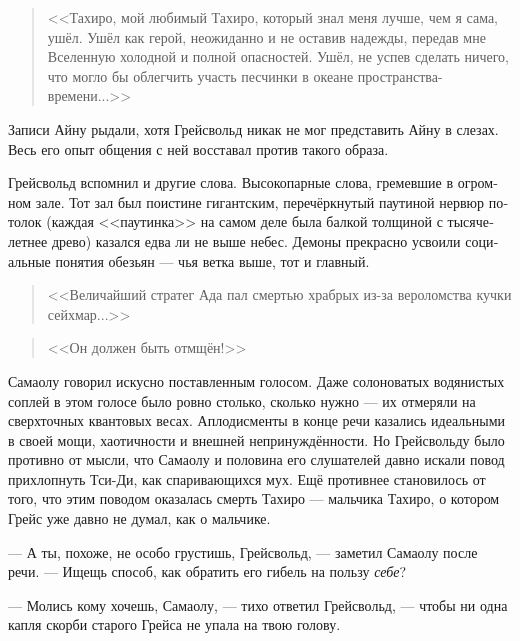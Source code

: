 \documentclass[a4paper,12pt,fleqn]{book}\usepackage{polyglossia}\setdefaultlanguage[babelshorthands=true]{russian}\setotherlanguage{english}\defaultfontfeatures{Ligatures=TeX,Mapping=tex-text}\usepackage{xcolor}\newcommand{\ml}[3]{#2}
\begin{document}
\begin{quote}
<<Тахиро, мой любимый Тахиро, который знал меня лучше, чем я сама, ушёл.
Ушёл как герой, неожиданно и не оставив надежды, передав мне Вселенную холодной и полной опасностей.
Ушёл, не успев сделать ничего, что могло бы облегчить участь песчинки в океане пространства-времени...>>
\end{quote}

Записи Айну рыдали, хотя Грейсвольд никак не мог представить Айну в слезах.
Весь его опыт общения с ней восставал против такого образа.

Грейсвольд вспомнил и другие слова.
Высокопарные слова, гремевшие в огромном зале.
Тот зал был поистине гигантским, перечёркнутый паутиной нервюр потолок (каждая <<паутинка>> на самом деле была балкой толщиной с тысячелетнее древо) казался едва ли не выше небес.
Демоны прекрасно усвоили социальные понятия обезьян --- чья ветка выше, тот и главный.

\begin{quote}
<<Величайший стратег Ада пал смертью храбрых из-за вероломства кучки сейхмар...>>
\end{quote}

\begin{quote}
<<Он должен быть отмщён!>>
\end{quote}

Самаолу говорил искусно поставленным голосом.
Даже солоноватых водянистых соплей в этом голосе было ровно столько, сколько нужно --- их отмеряли на сверхточных квантовых весах.
Аплодисменты в конце речи казались идеальными в своей мощи, хаотичности и внешней непринуждённости.
\ml{$0$}
{Но Грейсвольду было противно от мысли, что Самаолу и половина его слушателей давно искали повод прихлопнуть Тси-Ди, как спаривающихся мух.}
{But Grejsvolt hated even the thought that Samajolu and a half of his audience were always looking for an excuse to swat Qi-Di like mating flies.}
\ml{$0$}
{Ещё противнее становилось от того, что этим поводом оказалась смерть Тахиро --- мальчика Тахиро, о котором Грейс уже давно не думал, как о мальчике.}
{The only thing he hated more was another thought: the same excuse was death of Tahiro-kid; Grejsvolt didn't thought of Tajiro as a kid for ages.}

--- А ты, похоже, не особо грустишь, Грейсвольд, --- заметил Самаолу после речи.
--- Ищещь способ, как обратить его гибель на пользу \emph{себе}?

\ml{$0$}
{--- Молись кому хочешь, Самаолу, --- тихо ответил Грейсвольд, --- чтобы ни одна капля скорби старого Грейса не упала на твою голову.}
{``Pray to whatever you want, Samajolu,'' Grejsvolt answered quietly, ``that no one drop of Old Grejs' sorrow falls on your head.''}
\end{document}
